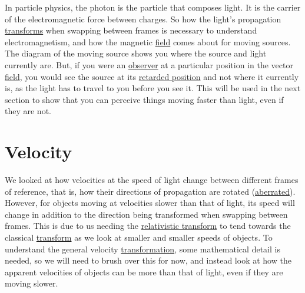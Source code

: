 In particle physics, the photon is the particle that composes light.
It is the carrier of the electromagnetic force between charges.
So how the light's propagation \hyperlink{def-transform}{transforms} when swapping between frames is necessary to understand electromagnetism, and how the magnetic \hyperlink{def-field}{field} comes about for moving sources.
The diagram of the moving source shows you where the source and light currently are.
But, if you were an \hyperlink{def-observer}{observer} at a particular position in the vector \hyperlink{def-field}{field}, you would see the source at its \hyperlink{def-retarded-position}{retarded position} and not where it currently is, as the light has to travel to you before you see it.
This will be used in the next section to show that you can perceive things moving faster than light, even if they are not.


\section{Velocity} \label{sect: (intro) Velocity}

We looked at how velocities at the speed of light change between different frames of reference, that is, how their directions of propagation are rotated (\hyperlink{def-aberration}{aberrated}).
However, for objects moving at velocities slower than that of light, its speed will change in addition to the direction being transformed when swapping between frames.
This is due to us needing the \hyperlink{def-lorentz-transform}{relativistic transform} to tend towards the classical \hyperlink{def-transform}{transform} as we look at smaller and smaller speeds of objects.
To understand the general velocity \hyperlink{def-transform}{transformation}, some mathematical detail is needed, so we will need to brush over this for now, and instead look at how the apparent velocities of objects can be more than that of light, even if they are moving slower.

